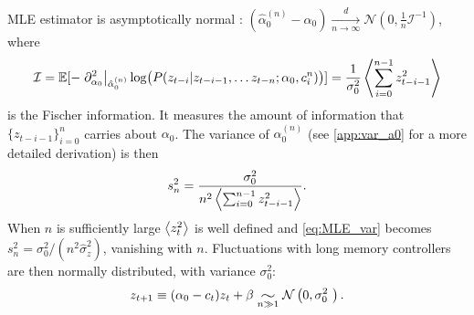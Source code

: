 \documentclass[FinalReport.tex]{subfiles}
\begin{document}
MLE estimator is asymptotically normal \cite{CoxHink74}: $(\hat{\alpha}_0^{(n)}-\alpha_0)\underset{n\rightarrow\infty}{\stackrel{d}{\longrightarrow}}\mathcal{N}\left(0,\frac{1}{n}\mathcal{I}^{-1}\right)$, where 
\begin{equation}\label{eq:MLE_var}
	 \mathcal{I}=\mathbb{E}[-\left.\partial^2_{\alpha_0}\right\vert_{\hat{\alpha}_0^{(n)}} \log\bigl(P(z_{t-i}\vert z_{t-i-1},\dots z_{t-n};\alpha_0,c_i^n)\bigr)]=\frac{1}{\sigma_0^2}\expval{\sum_{i=0}^{n-1}z^2_{t-i-1}}
\end{equation} 
is the Fischer information. It measures the amount of information that $\{z_{t-i-1}\}_{i=0}^{n}$ carries about $\alpha_0$. The variance of $\hat{\alpha}_0^{(n)}$ (see \autoref{app:var_a0} for a more detailed derivation) is then
\begin{equation}\label{eq:MLE_var}
	s_n^2=\frac{\sigma_0^2}{n^2\expval{\sum_{i=0}^{n-1}z^2_{t-i-1}}}.
\end{equation}
When $n$ is sufficiently large $\expval{z_t^2}$ is well defined and \eqref{eq:MLE_var} becomes $s_n^2=\sigma_0^2/(n^2 \hat{\sigma}_z^2)$, vanishing with $n$. Fluctuations with long memory controllers are then normally distributed, with variance $\sigma_0^2$:
\begin{equation}
	z_{t+1}\equiv(\alpha_0-c_t)z_t+\beta \widesim{n\gg 1} \mathcal{N}\left(0,\sigma_0^2 \right).
\end{equation}

\def\longz{8.74}
\def\explongz{-4}
\def\longvarz{0.81}
\def\longmaxz{0}
\end{document}
